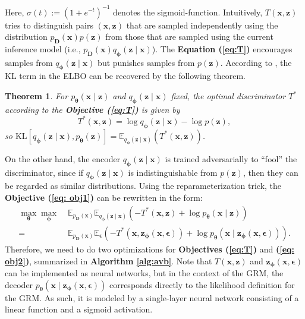 \documentclass[a4paper,12pt]{article}
\theoremstyle{plain} %
\newtheorem{theorem}{Theorem}[section] %
\theoremstyle{remark} %
\theoremstyle{definition} %
\begin{document}
Here, $\sigma(t) := \left(1 + e^{-t}\right)^{-1}$ denotes the sigmoid-function. Intuitively, $T(\bm{x}, \bm{z})$ tries to distinguish pairs $(\bm{x}, \bm{z})$ that are sampled independently using the distribution $p_{\bm{D}}(\bm{x}) p(\bm{z})$ from those that are sampled using the current inference model (i.e., $p_{\bm{D}}(\bm{x}) q_{\bm{\phi}}(\bm{z} \mid \bm{x})$). The \textbf{Equation (\ref{eq:T})} encourages samples from $q_{\bm{\phi}}(\bm{z} \mid \bm{x})$ but punishes samples from $p(\bm{z})$. According to \citet{mescheder2017adversarial}, the KL term in the ELBO can be recovered by the following theorem.
\begin{theorem}\label{thm:T_1}
    For $p_{\bm{\theta}}(\bm{x} \mid \bm{z})$ and $q_{\bm{\phi}}(\bm{z} \mid \bm{x})$ fixed, the optimal discriminator $T^*$ according to the \textbf{Objective (\ref{eq:T})} is given by
    \begin{equation}\label{eq:T_thm}
    T^*(\bm{x}, \bm{z}) = \log q_{\bm{\phi}}(\bm{z} \mid \bm{x}) - \log p(\bm{z}), 
    \end{equation}
    so $\text{KL}\left[ q_{\bm{\phi}}(\bm{z}\mid\bm{x}), p_{\bm{\theta}}(\bm{z})\right] = \mathbb{E}_{q_{\bm{\phi}}(\bm{z} \mid \bm{x})} \left(T^*(\bm{x}, \bm{z})\right)$.
\end{theorem}
On the other hand, the encoder $q_{\bm{\phi}}(\bm{z} \mid \bm{x})$ is trained adversarially to ``fool'' the discriminator, since if $q_{\bm{\phi}}(\bm{z} \mid \bm{x})$ is indistinguishable from $p(\bm{z})$, then they can be regarded as similar distributions. Using the reparameterization trick, the \textbf{Objective (\ref{eq: obj1})} can be rewritten in the form:
\begin{equation}\label{eq: obj2}
\begin{aligned}
\max_{\bm{\theta}} \max_{\bm{\phi}} \;&\mathbb{E}_{p_{\bm{D}}(\bm{x})} 
\mathbb{E}_{q_{\bm{\phi}}(\bm{z} \mid \bm{x})} \left( 
- T^*(\bm{x}, \bm{z})
+ \log p_{\bm{\theta}}(\bm{x} \mid \bm{z}) 
\right)\\
=&\mathbb{E}_{p_{\bm{D}}(\bm{x})} \mathbb{E}_{\bm{\epsilon}} 
\left( - {T}^*\left( \bm{x}, \bm{z}_{\bm{\phi}}(\bm{x}, \bm{\epsilon}) \right) 
+ \log p_{\bm{\theta}} \left( \bm{x} \mid \bm{z}_{\bm{\phi}}(\bm{x}, \bm{\epsilon}) \right) 
\right).
\end{aligned}
\end{equation}
Therefore, we need to do two optimizations for \textbf{Objectives (\ref{eq:T})} and \textbf{(\ref{eq: obj2})}, summarized in \textbf{Algorithm \ref{alg:avb}}. Note that \( T(\bm{x}, \bm{z}) \) and \( \bm{z}_{\bm{\phi}}(\bm{x}, \bm{\epsilon}) \) can be implemented as neural networks, but in the context of the GRM, the decoder \( p_{\bm{\theta}} \left( \bm{x} \mid \bm{z}_{\bm{\phi}}(\bm{x}, \bm{\epsilon}) \right) \) corresponds directly to the likelihood definition for the GRM. As such, it is modeled by a single-layer neural network consisting of a linear function and a sigmoid activation. 
\end{document}

